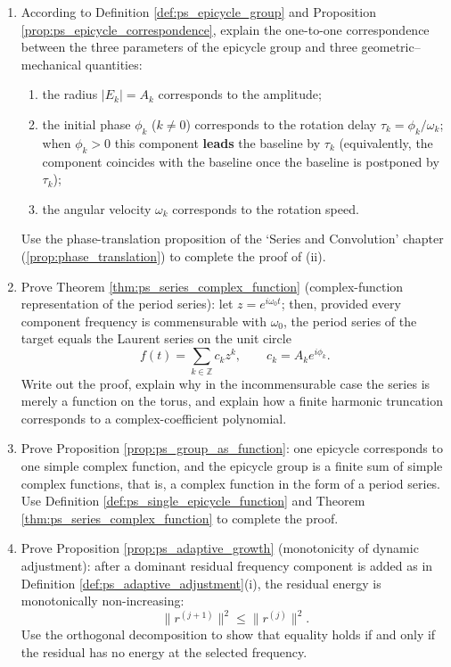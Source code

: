 \begin{enumerate}[leftmargin=3em, label=\textbf{Exercise \arabic*}]
    \item According to Definition \ref{def:ps_epicycle_group} and Proposition \ref{prop:ps_epicycle_correspondence},
    explain the one-to-one correspondence between the three parameters of the epicycle group
    and three geometric--mechanical quantities:
    \begin{enumerate}[label=(\roman*)]
        \item the radius $|E_k|=A_k$ corresponds to the amplitude;
        \item the initial phase $\phi_k$ ($k\ne0$) corresponds to the rotation delay $\tau_k=\phi_k/\omega_k$; when $\phi_k>0$ this component \textbf{leads} the baseline by $\tau_k$ (equivalently, the component coincides with the baseline once the baseline is postponed by $\tau_k$);
        \item the angular velocity $\omega_k$ corresponds to the rotation speed.
    \end{enumerate}
    Use the phase-translation proposition of the `Series and Convolution' chapter
    (\cref{prop:phase_translation}) to complete the proof of (ii).

    \item Prove Theorem \ref{thm:ps_series_complex_function} (complex-function representation of the period series):
    let $z=e^{i\omega_0t}$; then, provided every component frequency is commensurable with $\omega_0$, the period series of the target equals the Laurent series on the unit circle
    \[
    f(t)=\sum_{k\in\mathbb{Z}}c_kz^k,\qquad c_k=A_ke^{i\phi_k}.
    \]
    Write out the proof, explain why in the incommensurable case the series is merely a function on the torus, and explain how a finite harmonic truncation corresponds to a complex-coefficient polynomial.

    \item Prove Proposition \ref{prop:ps_group_as_function}:
    one epicycle corresponds to one simple complex function, and the epicycle group is a finite sum
    of simple complex functions, that is, a complex function in the form of a period series.
    Use Definition \ref{def:ps_single_epicycle_function} and
    Theorem \ref{thm:ps_series_complex_function} to complete the proof.

    \item Prove Proposition \ref{prop:ps_adaptive_growth} (monotonicity of dynamic adjustment):
    after a dominant residual frequency component is added as in Definition \ref{def:ps_adaptive_adjustment}(i),
    the residual energy is monotonically non-increasing:
    \[
    \|r^{(j+1)}\|^2\le\|r^{(j)}\|^2.
    \]
    Use the orthogonal decomposition to show that equality holds if and only if the residual has no energy at the selected frequency.


\end{enumerate}
